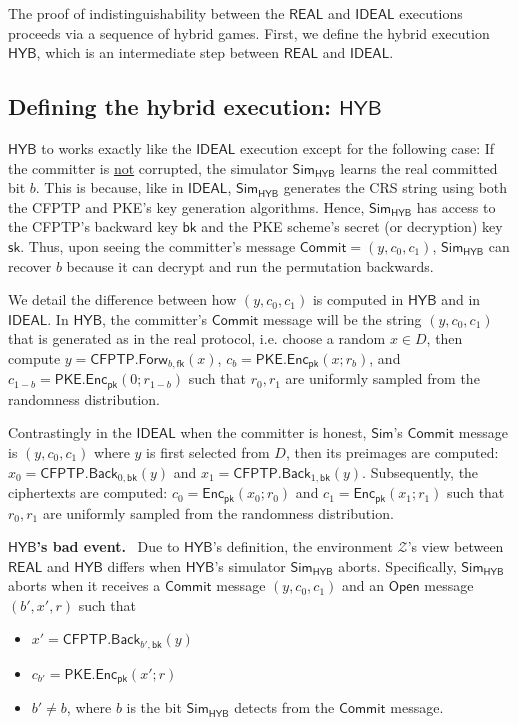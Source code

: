 \documentclass{article}[12pt]
\newcommand{\parhead}[1]{\textbf{#1}~}
\newcommand{\OpenMsg}{\mathsf{Open}}
\newcommand{\CommitMsg}{\mathsf{Commit}}
\newcommand{\PKE}{\mathsf{PKE}}
\newcommand{\Enc}{\mathsf{Enc}}
\newcommand{\EncKey}{\mathsf{pk}}
\newcommand{\DecKey}{\mathsf{sk}}
\newcommand{\CFPTP}{\mathsf{CFPTP}}
\newcommand{\Forw}{\mathsf{Forw}}
\newcommand{\Back}{\mathsf{Back}}
\newcommand{\ForwKey}{\mathsf{fk}}
\newcommand{\BackKey}{\mathsf{bk}}
\newcommand{\Domain}{D}
\newcommand{\Simulator}{{\mathsf{Sim}}} %
\newcommand{\Environment}{{\mathcal{Z}}} %
\newcommand{\Ideal}{{\mathsf{IDEAL}}}
\newcommand{\Hyb}{{\mathsf{HYB}}}
\newcommand{\Real}{{\mathsf{REAL}}}
\begin{document}
The proof of indistinguishability between the $\Real$ and $\Ideal$ executions proceeds via a sequence of hybrid games. First, we define the hybrid execution $\Hyb$, which is an intermediate step between $\Real$ and $\Ideal$.

\subsection{Defining the hybrid execution: $\Hyb$}

$\Hyb$ to works exactly like the $\Ideal$ execution except for the following case: If the committer is \underline{not} corrupted, the simulator $\Simulator_{\Hyb}$ learns the real committed bit $b$. This is because, like in $\Ideal$, $\Simulator_{\Hyb}$ generates the CRS string using both the CFPTP and PKE's key generation algorithms. Hence, $\Simulator_{\Hyb}$ has access to the CFPTP's backward key $\BackKey$ and the PKE scheme's secret (or decryption) key $\DecKey$. Thus, upon seeing the committer's message $\CommitMsg = (y, c_0, c_1)$, $\Simulator_{\Hyb}$ can recover $b$ because it can decrypt and run the permutation backwards.

We detail the difference between how $(y, c_0, c_1)$ is computed in $\Hyb$ and in $\Ideal$. In $\Hyb$, the committer's $\CommitMsg$ message will be the string $(y, c_0, c_1)$ that is generated as in the real protocol, i.e. choose a random $x \in D$, then compute $y = \CFPTP.\Forw_{b, \ForwKey}(x)$, $c_b = \PKE.\Enc_\EncKey(x; r_b)$, and $c_{1-b} = \PKE.\Enc_\EncKey(0; r_{1-b})$ such that $r_0, r_1$ are uniformly sampled from the randomness distribution.

Contrastingly in the $\Ideal$ when the committer is honest, $\Simulator$'s $\CommitMsg$ message is $(y, c_0, c_1)$ where $y$ is first selected from $\Domain$, then its preimages are computed: $x_0 = \CFPTP.\Back_{0, \BackKey}(y)$ and $x_1 = \CFPTP.\Back_{1, \BackKey}(y)$. Subsequently, the ciphertexts are computed: $c_0 = \Enc_\EncKey(x_0; r_0)$ and $c_1 = \Enc_\EncKey(x_1; r_1)$ such that $r_0, r_1$ are uniformly sampled from the randomness distribution.

\parhead{$\Hyb$'s bad event.}
Due to $\Hyb$'s definition, the environment $\Environment$'s view between $\Real$ and $\Hyb$ differs when $\Hyb$'s simulator $\Simulator_\Hyb$ aborts. Specifically, $\Simulator_\Hyb$ aborts when it receives a $\CommitMsg$ message $(y, c_0, c_1)$ and an $\OpenMsg$ message $(b', x', r)$ such that
\begin{itemize}
	\item $x' = \CFPTP.\Back_{b', \BackKey}(y)$
	\item $c_{b'} = \PKE.\Enc_\EncKey(x'; r)$
	\item $b' \ne b$, where $b$ is the bit $\Simulator_\Hyb$ detects from the $\CommitMsg$ message.
\end{itemize}
\end{document}
